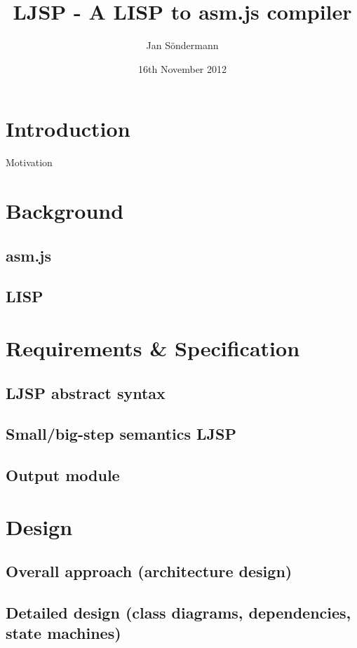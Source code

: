 \documentclass[11pt]{report}
\title{LJSP - A LISP to asm.js compiler}
\author{Jan S\"ondermann}
\date{16th November 2012}
\begin{document}
\maketitle


\tableofcontents

\chapter{Introduction}
Motivation

\chapter{Background}
\section{asm.js}
\section{LISP}

\chapter{Requirements \& Specification}
\section{LJSP abstract syntax}
\section{Small/big-step semantics LJSP}
\section{Output module}

\chapter{Design}
\section{Overall approach (architecture design)}
\section{Detailed design (class diagrams, dependencies, state machines)}
\end{document}

